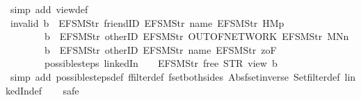 \begin{isabellebody}
\ {\isacharparenleft}simp\ add{\isacharcolon}\ view{}{\isacharunderscore}def{\isacharparenright}%
\endisatagproof
{\isafoldproof}%
%
\isadelimproof
\isanewline
%
\endisadelimproof
\isanewline
{}\isamarkupfalse%
\ invalid{\isacharcolon}\ {\isachardoublequoteopen}b\ {\isasymnoteq}\ {\isacharbrackleft}EFSM{\isachardot}Str\ {\isacharprime}{\isacharprime}friendID{\isacharprime}{\isacharprime}{\isacharcomma}\ EFSM{\isachardot}Str\ {\isacharprime}{\isacharprime}name{\isacharprime}{\isacharprime}{\isacharcomma}\ EFSM{\isachardot}Str\ {\isacharprime}{\isacharprime}HM{}p{\isacharprime}{\isacharprime}{\isacharbrackright}\ {\isasymLongrightarrow}\isanewline
\ \ \ \ \ \ \ \ b\ {\isasymnoteq}\ {\isacharbrackleft}EFSM{\isachardot}Str\ {\isacharprime}{\isacharprime}otherID{\isacharprime}{\isacharprime}{\isacharcomma}\ EFSM{\isachardot}Str\ {\isacharprime}{\isacharprime}OUT{\isacharunderscore}OF{\isacharunderscore}NETWORK{\isacharprime}{\isacharprime}{\isacharcomma}\ EFSM{\isachardot}Str\ {\isacharprime}{\isacharprime}MNn{}{\isacharprime}{\isacharprime}{\isacharbrackright}\ {\isasymLongrightarrow}\isanewline
\ \ \ \ \ \ \ \ b\ {\isasymnoteq}\ {\isacharbrackleft}EFSM{\isachardot}Str\ {\isacharprime}{\isacharprime}otherID{\isacharprime}{\isacharprime}{\isacharcomma}\ EFSM{\isachardot}Str\ {\isacharprime}{\isacharprime}name{\isacharprime}{\isacharprime}{\isacharcomma}\ EFSM{\isachardot}Str\ {\isacharprime}{\isacharprime}{}zoF{\isacharprime}{\isacharprime}{\isacharbrackright}\ {\isasymLongrightarrow}\isanewline
\ \ \ \ \ \ \ \ possible{\isacharunderscore}steps\ linkedIn\ {}\ {\isacharless}{}\ {\isacharcolon}{\isacharequal}\ EFSM{\isachardot}Str\ {\isacharprime}{\isacharprime}free{\isacharprime}{\isacharprime}{\isachargreater}\ STR\ {\isacharprime}{\isacharprime}view{\isacharprime}{\isacharprime}\ b\ {\isacharequal}\ {\isacharbraceleft}{\isacharbar}{\isacharbar}{\isacharbraceright}{\isachardoublequoteclose}\isanewline
%
\isadelimproof
\ \ %
\endisadelimproof
%
\isatagproof
{}\isamarkupfalse%
\ {\isacharparenleft}simp\ add{\isacharcolon}\ possible{\isacharunderscore}steps{\isacharunderscore}def\ ffilter{\isacharunderscore}def\ fset{\isacharunderscore}both{\isacharunderscore}sides\ Abs{\isacharunderscore}fset{\isacharunderscore}inverse\ Set{\isachardot}filter{\isacharunderscore}def\ linkedIn{\isacharunderscore}def{\isacharparenright}\isanewline
\ \ \isamarkupfalse%
\ safe\isanewline
\ \ \ \ \ \isamarkupfalse%

\end{isabellebody}
